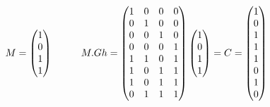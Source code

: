 \documentclass[12pt]{article}
\begin{document}
\begin{align*}
  M =
  \left(
    \begin{matrix}
      1 \\
      0 \\
      1 \\
      1 \\
    \end{matrix}
  \right)
  \hspace{1cm}
  M.Gh =
  \left(
    \begin{matrix}
    1 & 0 & 0 & 0 \\
    0 & 1 & 0 & 0 \\
    0 & 0 & 1 & 0 \\
    0 & 0 & 0 & 1 \\
    1 & 1 & 0 & 1 \\
    1 & 0 & 1 & 1 \\
    1 & 0 & 1 & 1 \\
    0 & 1 & 1 & 1
    \end{matrix}
  \right)
  \left(
    \begin{matrix}
      1 \\
      0 \\
      1 \\
      1 \\
    \end{matrix}
  \right)
  = C =
  \left(
    \begin{matrix}
      1 \\
      0 \\
      1 \\
      1 \\
      1 \\
      0 \\
      1 \\
      0 \\
    \end{matrix}
  \right)
\end{align*}
\end{document}
